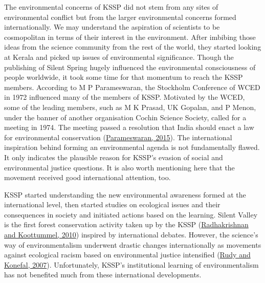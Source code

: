 \documentclass[twoside, 13pt]{article}
\begin{document}
{{{{\fontsize{12}{14}\selectfont
The environmental concerns of KSSP did not stem from any sites of environmental conflict but from the larger environmental concerns formed internationally. We may understand the aspiration of scientists to be cosmopolitan in terms of their interest in the environment. After imbibing those ideas from the science community from the rest of the world, they started looking at Kerala and picked up issues of environmental significance. Though the publishing of Silent Spring hugely influenced the environmental consciousness of people worldwide, it took some time for that momentum to reach the KSSP members. According to M P Parameswaran, the Stockholm Conference of WCED in 1972 influenced many of the members of KSSP. Motivated by the WCED, some of the leading members, such as M K Prasad, UK Gopalan, and P Menon, under the banner of another organisation Cochin Science Society, called for a meeting in 1974. The meeting passed a resolution that India should enact a law for environmental conservation (\underline{Parameswaran, 2015}). The international inspiration behind forming an environmental agenda is not fundamentally flawed. It only indicates the plausible reason for KSSP’s evasion of social and environmental justice questions. It is also worth mentioning here that the movement received good international attention, too.

\newpage

KSSP started understanding the new environmental awareness formed at the international level, then started studies on ecological issues and their consequences in society and initiated actions based on the learning. Silent Valley is the first forest conservation activity taken up by the KSSP (\underline{Radhakrishnan and Koottummel, 2010}) inspired by international debates. However, the science’s way of environmentalism underwent drastic changes internationally as movements against ecological racism based on environmental justice intensified (\underline{Rudy and Konefal, 2007}). Unfortunately, KSSP's institutional learning of environmentalism has not benefited much from these international developments.} 

}}}
\end{document}
